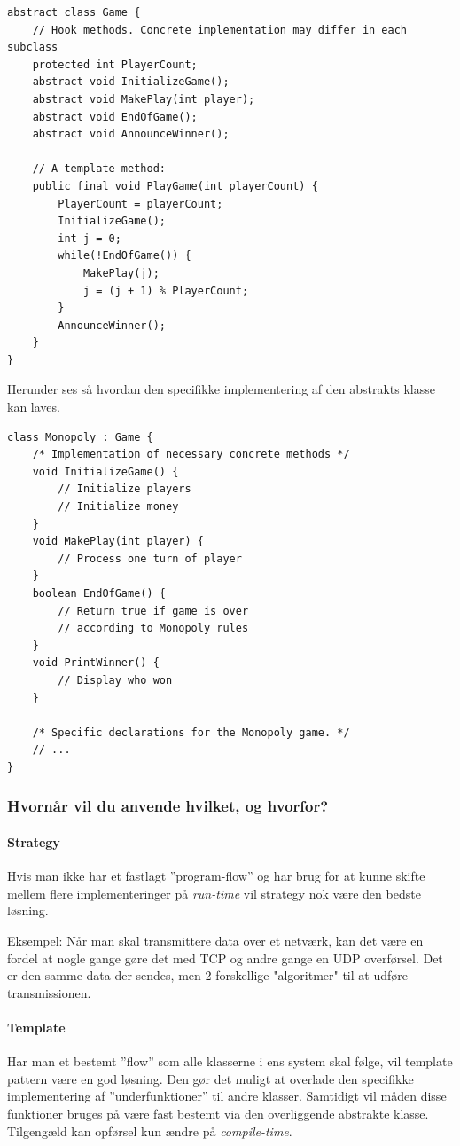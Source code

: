 \begin{lstlisting}
abstract class Game {
	// Hook methods. Concrete implementation may differ in each subclass
	protected int PlayerCount;
	abstract void InitializeGame();
	abstract void MakePlay(int player);
	abstract void EndOfGame();
	abstract void AnnounceWinner();
	
	// A template method:
	public final void PlayGame(int playerCount)	{
		PlayerCount = playerCount;
		InitializeGame();
		int j = 0;
		while(!EndOfGame()) {
			MakePlay(j);
			j = (j + 1) % PlayerCount;
		}
		AnnounceWinner();
	}
}
\end{lstlisting}

Herunder ses så hvordan den specifikke implementering af den abstrakts klasse kan laves.

\begin{lstlisting}
class Monopoly : Game {
	/* Implementation of necessary concrete methods */
	void InitializeGame() {
		// Initialize players
		// Initialize money
	}
	void MakePlay(int player) {
		// Process one turn of player
	}
	boolean EndOfGame() {
		// Return true if game is over 
		// according to Monopoly rules
	}
	void PrintWinner() {
		// Display who won
	}
	
	/* Specific declarations for the Monopoly game. */
	// ...
}
\end{lstlisting}

\subsubsection{Hvornår vil du anvende hvilket, og hvorfor?}\label{sec:tempvsstra}
\paragraph{Strategy}
Hvis man ikke har et fastlagt ''program-flow'' og har brug for at kunne skifte mellem flere implementeringer på \textit{run-time} vil strategy nok være den bedste løsning.

Eksempel: Når man skal transmittere data over et netværk, kan det være en fordel at nogle gange gøre det med TCP og andre gange en UDP overførsel. Det er den samme data der sendes, men 2 forskellige "algoritmer" til at udføre transmissionen.

\paragraph{Template}
Har man et bestemt ''flow'' som alle klasserne i ens system skal følge, vil template pattern være en god løsning. Den gør det muligt at overlade den specifikke implementering af ''underfunktioner'' til andre klasser. Samtidigt vil måden disse funktioner bruges på være fast bestemt via den overliggende abstrakte klasse. Tilgengæld kan opførsel kun ændre på \textit{compile-time}.